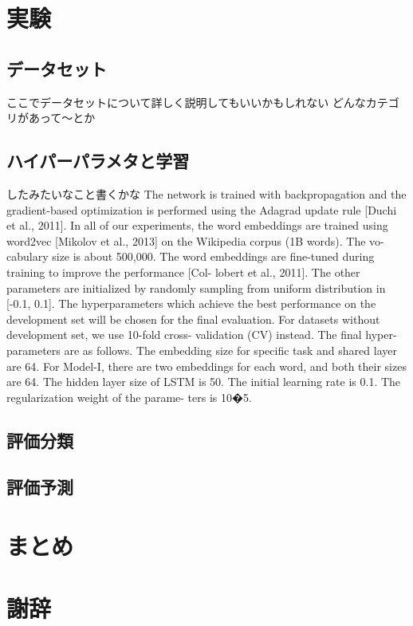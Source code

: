 \documentclass[dvipdfmx,twocolumn,10.5pt]{jsarticle}
\begin{document}
\section{実験}\label{experiment}
\subsection{データセット}\label{dataset}
ここでデータセットについて詳しく説明してもいいかもしれない
どんなカテゴリがあって〜とか
\subsection{ハイパーパラメタと学習}\label{ex_perp}
したみたいなこと書くかな
The network is trained with backpropagation and the gradient-based optimization is performed using the Adagrad update rule [Duchi et al., 2011]. In all of our experiments, the word embeddings are trained using word2vec [Mikolov et al., 2013] on the Wikipedia corpus (1B words). The vo- cabulary size is about 500,000. The word embeddings are fine-tuned during training to improve the performance [Col- lobert et al., 2011]. The other parameters are initialized by randomly sampling from uniform distribution in [-0.1, 0.1]. The hyperparameters which achieve the best performance on the development set will be chosen for the final evaluation. For datasets without development set, we use 10-fold cross- validation (CV) instead.
The final hyper-parameters are as follows. The embedding size for specific task and shared layer are 64. For Model-I, there are two embeddings for each word, and both their sizes are 64. The hidden layer size of LSTM is 50. The initial learning rate is 0.1. The regularization weight of the parame- ters is 10�5.
\subsection{評価分類}\label{ex_create}

\subsection{評価予測}\label{ex_create}

\section{まとめ}\label{matome}




\section{謝辞}\label{Acknowledgement}

\vspace{2em}




\end{document}

